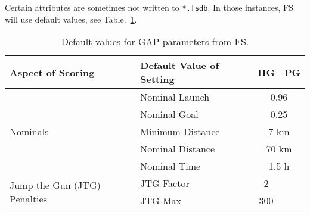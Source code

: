 \documentclass[gap.tex]{subfiles}
\begin{document}
Certain attributes are sometimes not written to \texttt{*.fsdb}. In those
instances, FS will use default values, see Table.~\ref{tab:gap-defaults}.

\begin{table}[!ht]
    \begin{tabularx}{\textwidth}{|X|l|c|c|}
    \hline
        Aspect of Scoring
        & Default Value of Setting
        & HG
        & PG
        \\
    \hline
        \multirow{5}{*}{Nominals}
        & Nominal Launch
        & \multicolumn{2}{c|}{0.96}
        \\
    \cline{2-4}
        & Nominal Goal
        & \multicolumn{2}{c|}{0.25}
        \\
    \cline{2-4}
        & Minimum Distance
        & \multicolumn{2}{c|}{7 km}
        \\
    \cline{2-4}
        & Nominal Distance
        & \multicolumn{2}{c|}{70 km}
        \\
    \cline{2-4}
        & Nominal Time
        & \multicolumn{2}{c|}{1.5 h}
        \\
    \hline
        \multirow{2}{*}{Jump the Gun (JTG) Penalties}
        & JTG Factor 
        & 2
        &
        \\
    \cline{2-4}
        & JTG Max
        & 300
        &
        \\
    \hline
    \end{tabularx}
    \caption{Default values for GAP parameters from FS.}
    \label{tab:gap-defaults}
\end{table}
\end{document}
